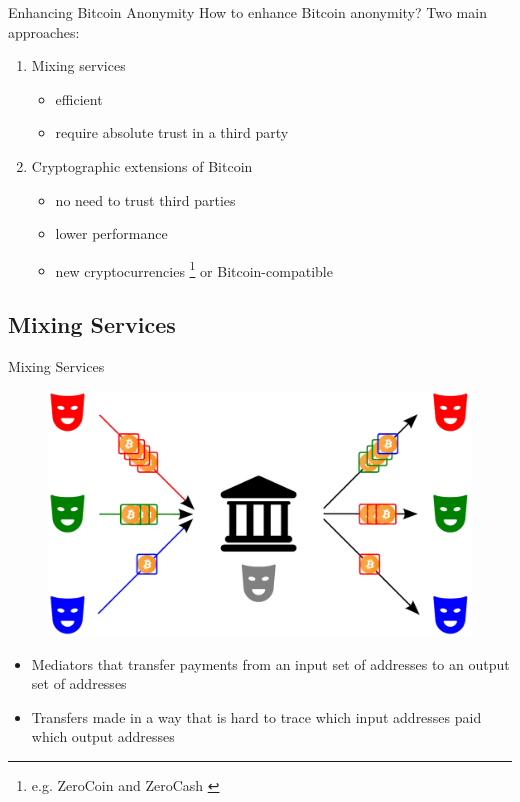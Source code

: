 \documentclass{beamer}
\begin{document}
  
  
  
  \begin{frame}{Enhancing Bitcoin Anonymity}
      How to enhance Bitcoin anonymity? Two main approaches:
      \begin{enumerate}
          \item Mixing services
          \begin{itemize}
              \item[\MVRightarrow] efficient
              \item[\MVRightarrow] require absolute trust in a third party
          \end{itemize}
          \item Cryptographic extensions of Bitcoin
          \begin{itemize}
              \item[\MVRightarrow] no need to trust third parties
              \item[\MVRightarrow] lower performance
              \item[\MVRightarrow] new cryptocurrencies \footnote{e.g. ZeroCoin \cite{miers2013zerocoin} and ZeroCash \cite{sasson2014zerocash}} or Bitcoin-compatible
          \end{itemize}
      \end{enumerate}
  \end{frame}
  
  
  \subsection{Mixing Services}
  \begin{frame}{Mixing Services}
      \begin{figure}
          \centering
          \includegraphics[width=0.6\linewidth]{../img/mixing-service-scheme.png}
      \end{figure}
      \begin{itemize}
          \item Mediators that transfer payments from an input set of addresses to an output set of addresses
          \item Transfers made in a way that is hard to trace which input addresses paid which output addresses
      \end{itemize}
  \end{frame}
  
\end{document}
